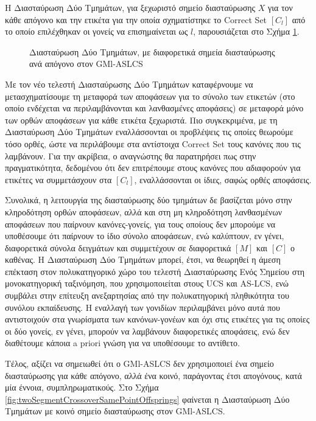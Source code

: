 Η Διασταύρωση Δύο Τμημάτων, για ξεχωριστό σημείο διασταύρωσης $X$ για τον κάθε απόγονο και την ετικέτα για την οποία σχηματίστηκε το Correct Set $[C_{l}]$ από το οποίο επιλέχθηκαν οι γονείς να επισημαίνεται ως $l$, παρουσιάζεται στο Σχήμα \ref{fig:twoSegmentCrossoverOffsprings}.

\begin{figure}[h!]
\centering
  
  \caption{Διασταύρωση Δύο Τμημάτων, με διαφορετικά σημεία διασταύρωσης ανά απόγονο στον GMl-ASLCS}
  \label{fig:twoSegmentCrossoverOffsprings}
\end{figure}


Με τον νέο τελεστή Διασταύρωσης Δύο Τμημάτων καταφέρνουμε να μετασχηματίσουμε τη μεταφορά των αποφάσεων για το σύνολο των ετικετών (στο οποίο ενδέχεται να περιλαμβάνονται και λανθασμένες αποφάσεις) σε μεταφορά μόνο των ορθών αποφάσεων για κάθε ετικέτα ξεχωριστά. Πιο συγκεκριμένα, με τη Διασταύρωση Δύο Τμημάτων εναλλάσσονται οι προβλέψεις τις οποίες θεωρούμε τόσο ορθές, ώστε να περιλάβουμε στα αντίστοιχα Correct Set τους κανόνες που τις λαμβάνουν. Για την ακρίβεια, ο αναγνώστης θα παρατηρήσει πως στην πραγματικότητα, δεδομένου ότι δεν επιτρέπουμε στους κανόνες που αδιαφορούν για ετικέτες να συμμετάσχουν στα $[C_{l}]$, εναλλάσσονται οι ίδιες, σαφώς ορθές αποφάσεις. 

Συνολικά, η λειτουργία της διασταύρωσης δύο τμημάτων δε βασίζεται μόνο στην κληροδότηση ορθών αποφάσεων, αλλά και στη μη κληροδότηση λανθασμένων αποφάσεων που παίρνουν κανόνες-γονείς, για τους οποίους δεν μπορούμε να υποθέσουμε ότι παίρνουν το ίδιο σύνολο αποφάσεων, ενώ καλύπτουν, εν γένει, διαφορετικά σύνολα δειγμάτων και συμμετέχουν σε διαφορετικά $[M]$ και $[C]$ ο καθένας. Η Διασταύρωση Δύο Τμημάτων μπορεί, έτσι, να θεωρηθεί η άμεση επέκταση στον πολυκατηγορικό χώρο του τελεστή Διασταύρωσης Ενός Σημείου στη μονοκατηγορική ταξινόμηση, που χρησιμοποιείται στους UCS και AS-LCS, ενώ συμβάλει στην επίτευξη ανεξαρτησίας από την πολυκατηγορική πληθικότητα του συνόλου εκπαίδευσης. Η εναλλαγή των γονιδίων περιλαμβάνει μόνο αυτά που αντιστοιχούν στα γνωρίσματα των κανόνων-γονέων και όχι στις ετικέτες για τις οποίες οι δύο γονείς, εν γένει, μπορούν να λαμβάνουν διαφορετικές αποφάσεις, ενώ δεν διαθέτουμε κάποια a priori γνώση για να υποθέσουμε το αντίθετο. 

Τέλος, αξίζει να σημειωθεί ότι ο GMl-ASLCS δεν χρησιμοποιεί ένα σημείο διασταύρωσης για κάθε απόγονο, αλλά ένα κοινό, παράγοντας έτσι απογόνους, κατά μία έννοια, συμπληρωματικούς. Στο Σχήμα \ref{fig:twoSegmentCrossoverSamePointOffsprings} φαίνεται η Διασταύρωση Δύο Τμημάτων με κοινό σημείο διασταύρωσης στον GMl-ASLCS.


